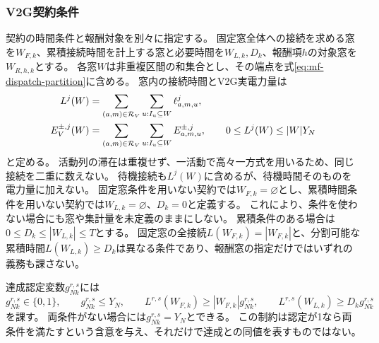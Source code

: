 \subsubsection{V2G契約条件}

契約の時間条件と報酬対象を別々に指定する。
固定窓全体への接続を求める窓を$W_{F,k}$、累積接続時間を計上する窓と必要時間を$W_{L,k},D_k$、報酬項$h$の対象窓を$W_{R,h,k}$とする。
各窓$W$は非重複区間の和集合とし、その端点を式\eqref{eq:mf-dispatch-partition}に含める。
窓内の接続時間とV2G実電力量は
\begin{align}
 L^j(W)&=\sum_{(a,m)\in\mathcal R_V}
   \sum_{u:I_u\subseteq W}\ell_{a,m,u}^j,\notag\\
 E_V^{\pm,j}(W)&=\sum_{(a,m)\in\mathcal R_V}
   \sum_{u:I_u\subseteq W}E_{a,m,u}^{\pm,j},\qquad
 0\le L^j(W)\le|W|Y_N
 \label{eq:mf-contract-accounting}
\end{align}
と定める。
活動列の滞在は重複せず、一活動で高々一方式を用いるため、同じ接続を二重に数えない。
待機接続も$L^j(W)$に含めるが、待機時間そのものを電力量に加えない。
固定窓条件を用いない契約では$W_{F,k}=\varnothing$とし、累積時間条件を用いない契約では$W_{L,k}=\varnothing$、$D_k=0$と定義する。
これにより、条件を使わない場合にも窓や集計量を未定義のままにしない。
累積条件のある場合は$0\le D_k\le|W_{L,k}|\le T$とする。
固定窓の全接続$L(W_{F,k})=|W_{F,k}|$と、分割可能な累積時間$L(W_{L,k})\ge D_k$は異なる条件であり、報酬窓の指定だけではいずれの義務も課さない。

達成認定変数$g_{Nk}^{r,s}$には
\begin{equation}
 g_{Nk}^{r,s}\in\{0,1\},\qquad g_{Nk}^{r,s}\le Y_N,\qquad
 L^{r,s}(W_{F,k})\ge|W_{F,k}|g_{Nk}^{r,s},\qquad
 L^{r,s}(W_{L,k})\ge D_kg_{Nk}^{r,s}
 \label{eq:mf-certificate}
\end{equation}
を課す。
両条件がない場合には$g_{Nk}^{r,s}=Y_N$とできる。
この制約は認定が1なら両条件を満たすという含意を与え、それだけで達成との同値を表すものではない。

